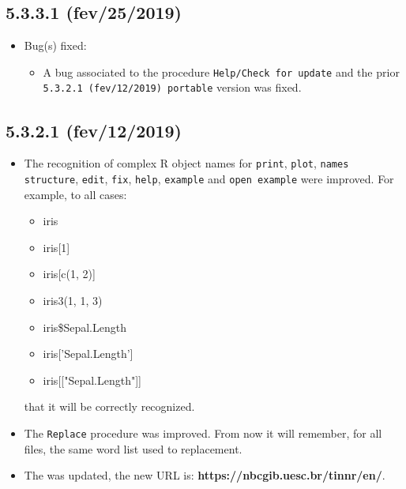 \subsection*{5.3.3.1 (fev/25/2019)}
\begin{itemize}
  \item Bug(s) fixed:
    \begin{itemize}
      \item A bug associated to the procedure \texttt{Help/Check for update} and the prior
        \texttt{5.3.2.1 (fev/12/2019) portable} version was fixed.
    \end{itemize}
\end{itemize}

\subsection*{5.3.2.1 (fev/12/2019)}
\begin{itemize}
  \item The recognition of complex R object names for \texttt{print}, \texttt{plot}, \texttt{names}
    \texttt{structure}, \texttt{edit}, \texttt{fix}, \texttt{help}, \texttt{example} and \texttt{open example}
      were improved. For example, to all cases:
    \begin{itemize}
      \item iris
      \item iris[1]
      \item iris[c(1, 2)]
      \item iris3(1, 1, 3)
      \item iris\$Sepal.Length
      \item iris['Sepal.Length']
      \item iris[["Sepal.Length"]]
    \end{itemize}
    that it will be correctly recognized.
  \item The \texttt{Replace} procedure was improved. From now it will remember, for all files, the same
    word list used to replacement.
  \item The  was updated,
    the new URL is: \textbf{https://nbcgib.uesc.br/tinnr/en/}.
\end{itemize}
